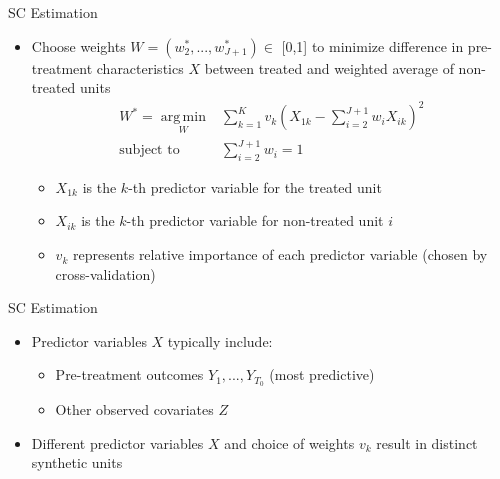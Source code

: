 \documentclass[hyperref={pdfpagelabels=false}]{beamer}
\DeclareMathOperator*{\argmin}{arg\,min}
\begin{document}
\begin{frame}{SC Estimation}
\begin{itemize}
	\item Choose weights $W=(w^{*}_{2},...,w^{*}_{J+1})$$\in$ [0,1] to minimize difference in pre-treatment characteristics $X$ between treated and weighted average of non-treated units
	\vspace{0.2cm}
	\begin{equation*}
		\begin{aligned}
			W^* = \argmin\limits_{W} & \sum_{k=1}^{K} v_k\left(X_{1k} - \sum_{i=2}^{J+1} w_i X_{ik}\right)^2 \\
			\text{subject to } & \sum_{i=2}^{J+1} w_i = 1 
		\end{aligned}
\end{equation*}

\begin{itemize}
	\item $X_{1k}$ is the $k$-th predictor variable for the treated unit
				\vspace{0.2cm}
		\item $X_{ik}$ is the $k$-th predictor variable for non-treated unit $i$
					\vspace{0.2cm}
			\item $v_k$ represents relative importance of each predictor variable (chosen by cross-validation)
\end{itemize}
\end{itemize}
\end{frame}





\begin{frame}{SC Estimation}
	\begin{itemize}
		
	\item Predictor variables $X$ typically include:
				\vspace{0.2cm}
			\begin{itemize}
					\item Pre-treatment outcomes $Y_{1},...,Y_{T_0}$ (most predictive)
								\vspace{0.2cm}
					\item Other observed covariates $Z$ 
				\end{itemize}
			\vspace{0.2cm}
			\item Different predictor variables $X$ and choice of weights $v_k$ result in distinct synthetic units
	\end{itemize}
\end{frame}
\end{document}
